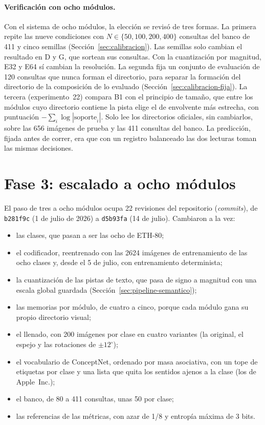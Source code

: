 \paragraph{Verificación con ocho módulos.}
Con el sistema de ocho módulos, la elección se revisó de tres formas.
La primera repite las nueve condiciones con $N \in \{50, 100, 200, 400\}$ consultas del
banco de 411 y cinco semillas (Sección~\ref{sec:calibracion}).
Las semillas solo cambian el resultado en D y G, que sortean sus consultas.
Con la cuantización por magnitud, E32 y E64 sí cambian la resolución.
La segunda fija un conjunto de evaluación de 120 consultas que nunca forman el
directorio, para separar la formación del directorio de la composición de lo evaluado
(Sección~\ref{sec:calibracion-fija}).
La tercera (experimento~22) compara B1 con el principio de tamaño, que entre los
módulos cuyo directorio contiene la pista elige el de envolvente más estrecha, con
puntuación $-\sum_i \log|\mathrm{soporte}_i|$.
Solo lee los directorios oficiales, sin cambiarlos, sobre las 656 imágenes de prueba y
las 411 consultas del banco.
La predicción, fijada antes de correr, era que con un registro balanceado las dos
lecturas toman las mismas decisiones.

\section{Fase 3: escalado a ocho módulos}
\label{fase3:escalado}

El paso de tres a ocho módulos ocupa 22 revisiones del repositorio (\textit{commits}), de \texttt{b281f9c} (1 de julio de
2026) a \texttt{d5b93fa} (14 de julio).
Cambiaron a la vez:
\begin{itemize}
    \item las clases, que pasan a ser las ocho de ETH-80;
    \item el codificador, reentrenado con las 2624 imágenes de entrenamiento de las ocho
    clases y, desde el 5 de julio, con entrenamiento determinista;
    \item la cuantización de las pistas de texto, que pasa de signo a magnitud con una
    escala global guardada (Sección~\ref{sec:pipeline-semantico});
    \item las memorias por módulo, de cuatro a cinco, porque cada módulo gana su propio
    directorio visual;
    \item el llenado, con 200 imágenes por clase en cuatro variantes (la original, el
    espejo y las rotaciones de $\pm 12^{\circ}$);
    \item el vocabulario de ConceptNet, ordenado por masa asociativa, con un tope de
    etiquetas por clase y una lista que quita los sentidos ajenos a la clase (los de
    Apple~Inc.);
    \item el banco, de 80 a 411 consultas, unas 50 por clase;
    \item las referencias de las métricas, con azar de 1/8 y entropía máxima de 3 bits.
\end{itemize}

